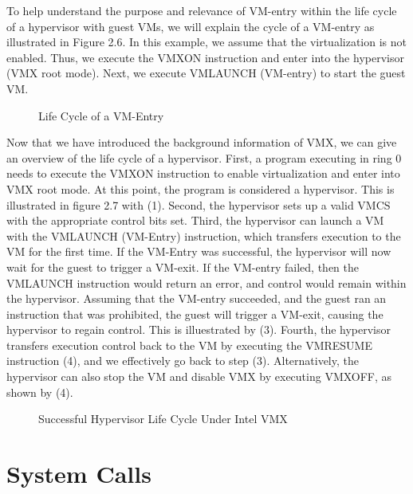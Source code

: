 \documentclass{report}
\begin{document}
\begin{spacing}{1.5}
{\large
To help understand the purpose and relevance of VM-entry within the life cycle of a hypervisor with guest VMs, we will explain the cycle of a VM-entry as illustrated in Figure 2.6. In this example, we assume that the virtualization is not enabled. Thus, we execute the VMXON instruction and enter into the hypervisor (VMX root mode). Next, we execute VMLAUNCH (VM-entry) to start the guest VM. 
\newline
}



\newpage
\vfill
{}
\begin{figure}[ht]
\centering
  \caption{Life Cycle of a VM-Entry}
\end{figure}


{\large
Now that we have introduced the background information of VMX, we can give an overview of the life cycle of a hypervisor. First, a program executing in ring 0 needs to execute the VMXON instruction to enable virtualization and enter into VMX root mode. At this point, the program is considered a hypervisor. This is illustrated in figure 2.7 with (1). Second, the hypervisor sets up a valid VMCS with the appropriate control bits set. Third, the hypervisor can launch a VM with the VMLAUNCH (VM-Entry) instruction, which transfers execution to the VM for the first time. If the VM-Entry was successful, the hypervisor will now wait for the guest to trigger a VM-exit. If the VM-entry failed, then the VMLAUNCH instruction would return an error, and control would remain within the hypervisor. Assuming that the VM-entry succeeded, and the guest ran an instruction that was prohibited, the guest will trigger a VM-exit, causing the hypervisor to regain control. This is illuestrated by (3). Fourth, the hypervisor transfers execution control back to the VM by executing the VMRESUME instruction (4), and we effectively go back to step (3). Alternatively, the hypervisor can also stop the VM and disable VMX by executing VMXOFF, as shown by (4).
\newline


\newpage
\vfill
{}
\begin{figure}[ht]
\centering
  \caption{Successful Hypervisor Life Cycle Under Intel VMX}
\end{figure}
}





\section{System Calls}


\end{spacing}
\end{document}
